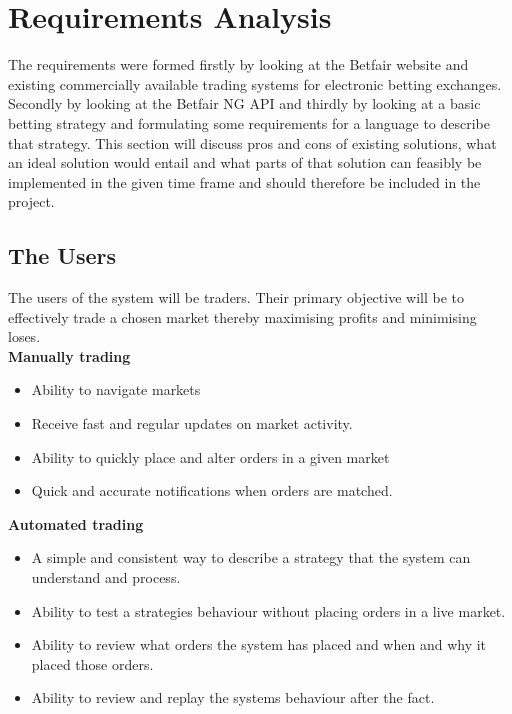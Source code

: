 \chapter{Requirements Analysis}

The requirements were formed firstly by looking at the Betfair website and existing commercially available trading systems for electronic betting exchanges. Secondly by looking at the Betfair NG API and thirdly by looking at a basic betting strategy and formulating some requirements for a language to describe that strategy. This section will discuss pros and cons of existing solutions, what an ideal solution would entail and what parts of that solution can feasibly be implemented in the given time frame and should therefore be included in the project.\\

\section{The Users}

The users of the system will be traders. Their primary objective will be to effectively trade a chosen market thereby maximising profits and minimising loses.\\

\textbf{Manually trading}\\
	\begin{itemize}
		\item Ability to navigate markets
		\item Receive fast and regular updates on market activity. 
		\item Ability to quickly place and alter orders in a given market 
		\item Quick and accurate notifications when orders are matched.
	\end{itemize}

\textbf{Automated trading}\\

	\begin{itemize}
		\item A simple and consistent way to describe a strategy that the system can understand and process. 
		\item Ability to test a strategies behaviour without placing orders in a live market. 
		\item Ability to review what orders the system has placed and when and why it placed those orders. 
		\item Ability to review and replay the systems behaviour after the fact.
	\end{itemize}

